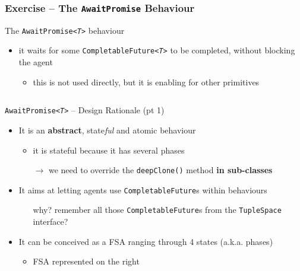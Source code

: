 \documentclass[presentation]{beamer}\mode<presentation>{\usetheme{AMSCesenaPurpleAndGold}}
\begin{document}
\begin{frame}[allowframebreaks]
	\frametitle{Exercise \currentExercise{} -- The \texttt{AwaitPromise} Behaviour}

	\begin{block}{The \texttt{AwaitPromise\textit{<T>}} behaviour}
		\begin{itemize}
			\item it waits for some \texttt{CompletableFuture\textit{<T>}} to be \alert{completed}, without blocking the agent
			\begin{itemize}\small
				\item this is not used directly, but it is enabling for other primitives
			\end{itemize}
		\end{itemize}
	\end{block}

	\framebreak

	\begin{columns}
		\begin{column}{.8\linewidth}
			\begin{exampleblock}{\texttt{AwaitPromise\textit{<T>}} -- Design Rationale (pt 1)}
				\begin{itemize}
					\item It is an \textbf{abstract}, \alert{state\emph{ful}} and \alert{atomic} behaviour
					\begin{itemize}
						\item it is stateful because it has several \alert{phases}
						\item[$\rightarrow$] we need to override the \texttt{\alert{deepClone()}} method \textbf{in sub-classes}
					\end{itemize}

					\medskip

					\item It aims at letting agents use \alert{\texttt{CompletableFuture}s} within behaviours
					\begin{itemize}
						\item[why?] remember all those \texttt{CompletableFuture}s from the \alert{\texttt{TupleSpace}} interface?
					\end{itemize}

					\medskip

					\item It can be conceived as a FSA ranging through 4 states (a.k.a. \alert{phases})
					\begin{itemize}
						\item FSA represented on the right
					\end{itemize}


\end{itemize}
\end{exampleblock}
\end{column}
\end{columns}
\end{frame}
\end{document}
